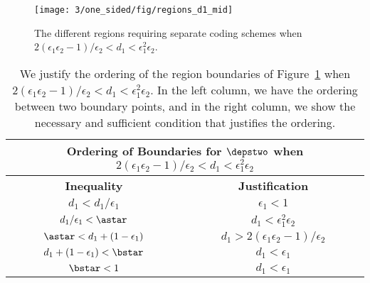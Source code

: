 \begin{figure}
	\centering
	\texttt{[image: 3/one\_sided/fig/regions\_d1\_mid]}
	\caption{The different regions requiring separate coding schemes when $2(\epsilon_1\epsilon_2 - 1)/\epsilon_2 < d_1 < \epsilon_1^2\epsilon_2$.}
	\label{fig:regions_d1_mid}
\end{figure}

\begin{table}
	\begin{center}
		\begin{tabular}{| c | c |}
			\hline
			\multicolumn{2}{|c|}{{\bf Ordering of Boundaries for $\depstwo$ when $2(\epsilon_1\epsilon_2 - 1)/\epsilon_2 < d_1 < \epsilon_1^2\epsilon_2$}} \\
			\hline
			{\bf Inequality} & {\bf Justification}   \\ \hline
			$d_1 < d_1/\epsilon_1$ & $\epsilon_1 < 1$ \\ \hline 
			$d_1/\epsilon_1 < \astar $ & $d_1 < \epsilon_1^2\epsilon_2$ \\ \hline 
			$\astar < d_1 + (1 - \epsilon_1)$ & $d_1 > 2(\epsilon_1\epsilon_2 - 1)/\epsilon_2$ \\ \hline 			
			$d_1 + (1 - \epsilon_1) < \bstar$ & $d_1 < \epsilon_1$ \\ \hline 
			$\bstar < 1$ & $d_1 < \epsilon_1$ \\
			\hline
		\end{tabular}
	\end{center}
	\caption{We justify the ordering of the region boundaries of Figure~\ref{fig:regions_d1_mid} when $2(\epsilon_1\epsilon_2 - 1)/\epsilon_2 < d_1 < \epsilon_1^2\epsilon_2$.  In the left column, we have the ordering between two boundary points, and in the right column, we show the necessary and sufficient condition that justifies the ordering.}	
	\label{tab:d1_mid}	
\end{table}
